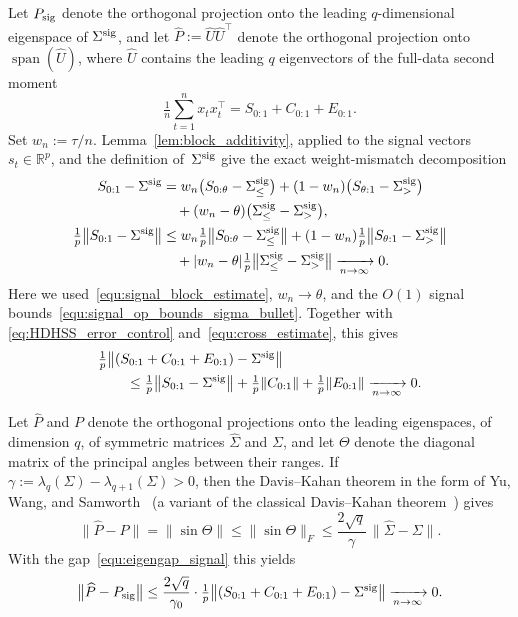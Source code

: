 \documentclass[10pt, letterpaper]{amsart}
\DeclareMathOperator{\Span}{span}
\begin{document}
 Let $P_{\rm sig}$ denote the orthogonal projection onto the leading $q$-dimensional eigenspace of $\Sigma^{\rm sig}$, and let $\widehat P:=\widehat U\widehat U^{\top}$ denote the orthogonal projection onto $\Span(\widehat U)$, where $\widehat U$ contains the leading $q$ eigenvectors of the full-data second moment
\[
\tfrac1n\sum_{t=1}^n x_tx_t^{\top}=S_{0:1}+C_{0:1}+E_{0:1}.
\]
Set $w_n:=\tau/n$.  Lemma~\ref{lem:block_additivity}, applied to the signal vectors $s_t\in\mathbb R^p$, and the definition of~$\Sigma^{\rm sig}$ give
the exact weight-mismatch decomposition
\begin{align*}
S_{0:1}-\Sigma^{\rm sig}
&=w_n\bigl(S_{0:\theta}-\Sigma_\le^{\rm sig}\bigr)
+(1-w_n)\bigl(S_{\theta:1}-\Sigma_>^{\rm sig}\bigr)\\
&\quad +(w_n-\theta)
\bigl(\Sigma_\le^{\rm sig}-\Sigma_>^{\rm sig}\bigr),\\
\tfrac1p\bigl\|S_{0:1}-\Sigma^{\rm sig}\bigr\|
&\leq w_n\tfrac1p\bigl\|S_{0:\theta}-\Sigma_\le^{\rm sig}\bigr\|
+(1-w_n)\tfrac1p\bigl\|S_{\theta:1}-\Sigma_>^{\rm sig}\bigr\|\\
&\quad +|w_n-\theta|\tfrac1p
\bigl\|\Sigma_\le^{\rm sig}-\Sigma_>^{\rm sig}\bigr\|
\xrightarrow[n\to\infty]{}0.
\end{align*}
Here we used~\eqref{equ:signal_block_estimate}, $w_n\to\theta$, and the
$O(1)$ signal bounds~\eqref{equ:signal_op_bounds_sigma_bullet}. Together with
\eqref{eq:HDHSS_error_control} and~\eqref{equ:cross_estimate}, this gives
\begin{align}
& \tfrac1p\bigl\|(S_{0:1}+C_{0:1}+E_{0:1})-\Sigma^{\rm sig}\bigr\|\\
& \qquad \le
\tfrac1p\bigl\|S_{0:1}-\Sigma^{\rm sig}\bigr\|
+\tfrac1p\|C_{0:1}\|
+\tfrac1p\|E_{0:1}\|
\xrightarrow[n\to\infty]{}0 .
\end{align}

Let $\widehat P$ and $P$ denote the orthogonal projections onto the leading eigenspaces, of dimension $q$, of symmetric matrices $\widehat\Sigma$ and $\Sigma$, and let $\Theta$ denote the diagonal matrix of the principal angles between their ranges. If $\gamma:=\lambda_q(\Sigma)-\lambda_{q+1}(\Sigma)>0$, then the Davis--Kahan theorem in the form of Yu, Wang, and Samworth~\cite[Theorem~2]{YuWangSamworth2015} (a variant of the classical Davis--Kahan theorem~\cite{davis1970rotation}) gives
\[
\|\widehat P-P\|
=\|\sin\Theta\|
\leq\|\sin\Theta\|_F
\leq\frac{2\sqrt q}{\gamma}\,\|\widehat\Sigma-\Sigma\|.
\]
With the gap~\eqref{equ:eigengap_signal} this yields
\begin{align}\label{equ:DK_projection}
\bigl\|\widehat P-P_{\rm sig}\bigr\|
\le
\frac{2\sqrt{q}}{\gamma_0}
\cdot
\tfrac1p
\bigl\|(S_{0:1}+C_{0:1}+E_{0:1})-\Sigma^{\rm sig}\bigr\|
\xrightarrow[n\to\infty]{}0.
\end{align}
\end{document}
